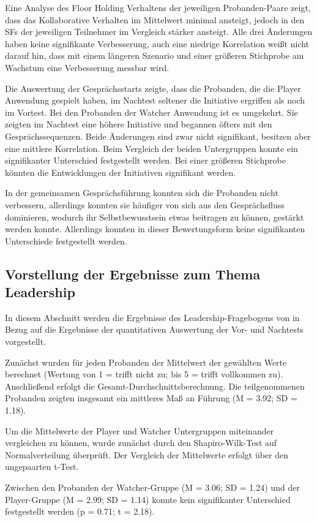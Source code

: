 Eine Analyse des Floor Holding Verhaltens der jeweiligen Probanden-Paare zeigt, dass das Kollaborative Verhalten im Mittelwert minimal ansteigt, jedoch in den \ac{SF}s der jeweiligen Teilnehmer im Vergleich stärker ansteigt. Alle drei Änderungen haben keine signifikante Verbesserung, auch eine niedrige Korrelation weißt nicht darauf hin, dass mit einem längeren Szenario und einer größeren Stichprobe am Wachstum eine Verbesserung messbar wird.

Die Auswertung der Gesprächsstarts zeigte, dass die Probanden, die die Player Anwendung gespielt haben, im Nachtest seltener die Initiative ergriffen als noch im Vortest. Bei den Probanden der Watcher Anwendung ist es umgekehrt. Sie zeigten im Nachtest eine höhere Initiative und begannen öfters mit den Gesprächssequenzen. Beide Änderungen sind zwar nicht signifikant, besitzen aber eine mittlere Korrelation. Beim Vergleich der beiden Untergruppen konnte ein signifikanter Unterschied festgestellt werden. Bei einer größeren Stichprobe könnten die Entwicklungen der Initiativen signifikant werden.

In der gemeinsamen Gesprächsführung konnten sich die Probanden nicht verbessern, allerdings konnten sie häufiger von sich aus den Gesprächsfluss dominieren, wodurch ihr Selbstbewusstsein etwas beitragen zu können, gestärkt werden konnte. Allerdings konnten in dieser Bewertungsform keine signifikanten Unterschiede festgestellt werden.


\subsection{Vorstellung der Ergebnisse zum Thema Leadership}
In diesem Abschnitt werden die Ergebnisse des Leadership-Fragebogens von \cite{emmerich_game_2016} in Bezug auf die Ergebnisse der quantitativen Auswertung der Vor- und Nachtests vorgestellt.

Zunächst wurden für jeden Probanden der Mittelwert der gewählten Werte berechnet (Wertung von 1 = trifft nicht zu; bis 5 = trifft vollkommen zu). Anschließend erfolgt die Gesamt-Durchschnittsberechnung. Die teilgenommenen Probanden zeigten insgesamt ein mittleres Maß an Führung (M = 3.92; SD = 1.18). 

Um die Mittelwerte der Player und Watcher Untergruppen miteinander vergleichen zu können, wurde zunächst durch den Shapiro-Wilk-Test auf Normalverteilung überprüft. Der Vergleich der Mittelwerte erfolgt über den ungepaarten t-Test.

Zwischen den Probanden der Watcher-Gruppe (M = 3.06; SD = 1.24) und der Player-Gruppe (M = 2.99; SD = 1.14) konnte kein signifikanter Unterschied festgestellt werden (p = 0.71; t = 2.18). 

